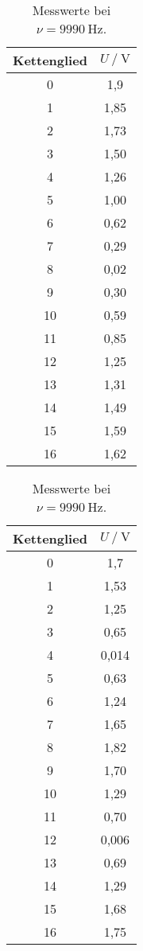 \begin{table}[h]
    \begin{minipage}{.45\linewidth}
      \caption{Messwerte bei $\nu = \SI{5040}{\hertz}$.}
      \label{tab:erstesmax}
      \centering
        \begin{tabular}{c c}
          \toprule
          Kettenglied & $U \:/\: \si{\volt}$\\
          \midrule
          0 & 1,9\\
          1 & 1,85\\
          2 & 1,73\\
          3 & 1,50\\
          4 & 1,26\\
          5 & 1,00\\
          6 & 0,62\\
          7 & 0,29\\
          8 & 0,02\\
          9 & 0,30\\
          10 & 0,59\\
          11 & 0,85\\
          12 & 1,25\\
          13 & 1,31\\
          14 & 1,49\\
          15 & 1,59\\
          16 & 1,62\\
          \bottomrule
        \end{tabular}
    \end{minipage}%
    \begin{minipage}{.45\linewidth}
      \centering
        \caption{Messwerte bei $\nu = \SI{9990}{\hertz}$.}
        \label{tab:zweitesmax}
        \begin{tabular}{c c}
          \toprule
          Kettenglied & $U \:/\: \si{\volt}$\\
          \midrule
          0 & 1,7\\
          1 & 1,53\\
          2 & 1,25\\
          3 & 0,65\\
          4 & 0,014\\
          5 & 0,63\\
          6 & 1,24\\
          7 & 1,65\\
          8 & 1,82\\
          9 & 1,70\\
          10 & 1,29\\
          11 & 0,70\\
          12 & 0,006\\
          13 & 0,69\\
          14 & 1,29\\
          15 & 1,68\\
          16 & 1,75\\
          \bottomrule
        \end{tabular}
    \end{minipage}
\end{table}

